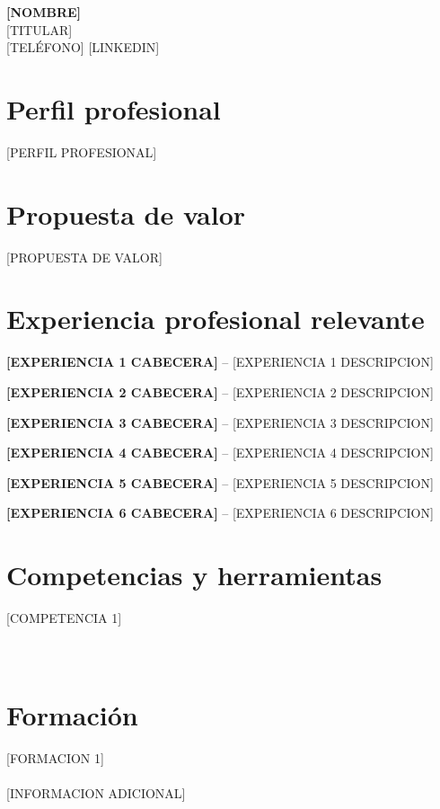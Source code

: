 \documentclass[11pt,a4paper]{article}
\begin{document}
{\color{primary}\LARGE\textbf{[NOMBRE]}}\\
{\color{secondary}\large [TITULAR]}\\
[EMAIL] \textbar{} [TELÉFONO] \textbar{} [LINKEDIN]

\section*{Perfil profesional}
[PERFIL PROFESIONAL]

\section*{Propuesta de valor}
[PROPUESTA DE VALOR]

\section*{Experiencia profesional relevante}
\textbf{[EXPERIENCIA 1 CABECERA]} -- [EXPERIENCIA 1 DESCRIPCION]

\textbf{[EXPERIENCIA 2 CABECERA]} -- [EXPERIENCIA 2 DESCRIPCION]

\textbf{[EXPERIENCIA 3 CABECERA]} -- [EXPERIENCIA 3 DESCRIPCION]

\textbf{[EXPERIENCIA 4 CABECERA]} -- [EXPERIENCIA 4 DESCRIPCION]

\textbf{[EXPERIENCIA 5 CABECERA]} -- [EXPERIENCIA 5 DESCRIPCION]

\textbf{[EXPERIENCIA 6 CABECERA]} -- [EXPERIENCIA 6 DESCRIPCION]

\section*{Competencias y herramientas}
[COMPETENCIA 1]\\
[COMPETENCIA 2]\\
[COMPETENCIA 3]\\
[COMPETENCIA 4]

\section*{Formación}
[FORMACION 1]\\
[FORMACION 2]\\
[FORMACION 3]

[INFORMACION ADICIONAL]
\end{document}
